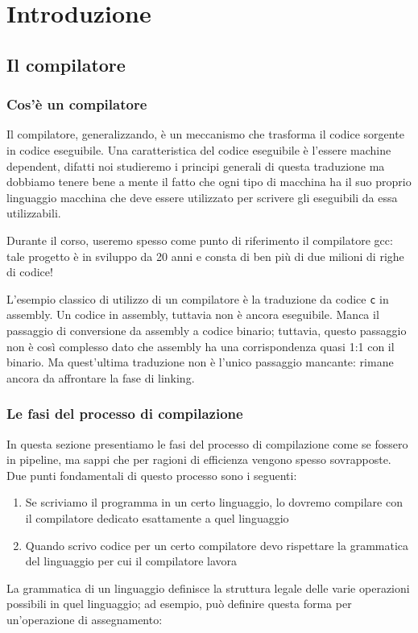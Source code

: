 \documentclass[class=book, crop=false, oneside, 12pt]{standalone}
\begin{document}
\chapter{Introduzione}

\section{Il compilatore}
\subsection{Cos'è un compilatore}
Il compilatore, generalizzando, è un meccanismo che trasforma il codice sorgente in codice eseguibile.
Una caratteristica del codice eseguibile è l'essere machine dependent, difatti noi studieremo i principi generali di questa traduzione ma dobbiamo tenere bene a mente il fatto che ogni tipo di macchina ha il suo proprio linguaggio macchina che deve essere utilizzato per scrivere gli eseguibili da essa utilizzabili.


Durante il corso, useremo spesso come punto di riferimento il compilatore gcc: tale progetto è in sviluppo da 20 anni e consta di ben più di due milioni di righe di codice!


L’esempio classico di utilizzo di un compilatore è la traduzione da codice \texttt{c} in assembly.
Un codice in assembly, tuttavia non è ancora eseguibile. Manca il passaggio di conversione da assembly a codice binario; tuttavia, questo passaggio non è così complesso dato che assembly ha una corrispondenza quasi 1:1 con il binario.
Ma quest’ultima traduzione non è l’unico passaggio mancante: rimane ancora da affrontare la fase di linking.

\subsection{Le fasi del processo di compilazione}
In questa sezione presentiamo le fasi del processo di compilazione come se fossero in pipeline, ma sappi che per ragioni di efficienza vengono spesso sovrapposte. Due punti fondamentali di questo processo sono i seguenti:
\begin{enumerate}
    \item Se scriviamo il programma in un certo linguaggio, lo dovremo compilare con il compilatore dedicato esattamente a quel linguaggio
    \item Quando scrivo codice per un certo compilatore devo rispettare la grammatica del linguaggio per cui il compilatore lavora
\end{enumerate}
La grammatica di un linguaggio definisce la struttura legale delle varie operazioni possibili in quel linguaggio; ad esempio, può definire questa forma per un’operazione di assegnamento:
\end{document}
